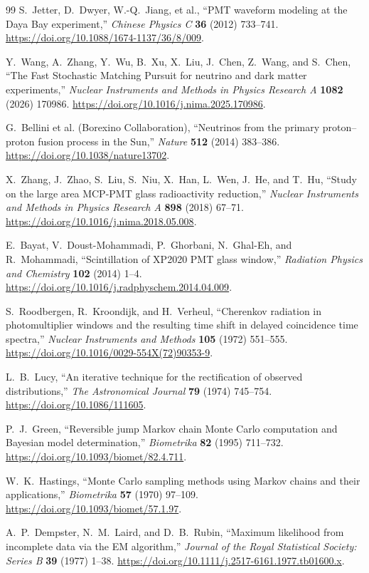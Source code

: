\documentclass[UTF8,a4paper,11pt]{ctexart}
\begin{document}
\begin{thebibliography}{99}
S.~Jetter, D.~Dwyer, W.-Q.~Jiang, et al.,
``PMT waveform modeling at the Daya Bay experiment,''
\emph{Chinese Physics C} \textbf{36} (2012) 733--741.
\url{https://doi.org/10.1088/1674-1137/36/8/009}.

Y.~Wang, A.~Zhang, Y.~Wu, B.~Xu, X.~Liu, J.~Chen, Z.~Wang, and S.~Chen,
``The Fast Stochastic Matching Pursuit for neutrino and dark matter
experiments,''
\emph{Nuclear Instruments and Methods in Physics Research A} \textbf{1082}
(2026) 170986.
\url{https://doi.org/10.1016/j.nima.2025.170986}.

G.~Bellini et al. (Borexino Collaboration),
``Neutrinos from the primary proton--proton fusion process in the Sun,''
\emph{Nature} \textbf{512} (2014) 383--386.
\url{https://doi.org/10.1038/nature13702}.

X.~Zhang, J.~Zhao, S.~Liu, S.~Niu, X.~Han, L.~Wen, J.~He, and T.~Hu,
``Study on the large area MCP-PMT glass radioactivity reduction,''
\emph{Nuclear Instruments and Methods in Physics Research A} \textbf{898}
(2018) 67--71.
\url{https://doi.org/10.1016/j.nima.2018.05.008}.

E.~Bayat, V.~Doust-Mohammadi, P.~Ghorbani, N.~Ghal-Eh, and R.~Mohammadi,
``Scintillation of XP2020 PMT glass window,''
\emph{Radiation Physics and Chemistry} \textbf{102} (2014) 1--4.
\url{https://doi.org/10.1016/j.radphyschem.2014.04.009}.

S.~Roodbergen, R.~Kroondijk, and H.~Verheul,
``Cherenkov radiation in photomultiplier windows and the resulting time shift
in delayed coincidence time spectra,''
\emph{Nuclear Instruments and Methods} \textbf{105} (1972) 551--555.
\url{https://doi.org/10.1016/0029-554X(72)90353-9}.

L.~B.~Lucy,
``An iterative technique for the rectification of observed distributions,''
\emph{The Astronomical Journal} \textbf{79} (1974) 745--754.
\url{https://doi.org/10.1086/111605}.

P.~J.~Green,
``Reversible jump Markov chain Monte Carlo computation and Bayesian model
determination,''
\emph{Biometrika} \textbf{82} (1995) 711--732.
\url{https://doi.org/10.1093/biomet/82.4.711}.

W.~K.~Hastings,
``Monte Carlo sampling methods using Markov chains and their applications,''
\emph{Biometrika} \textbf{57} (1970) 97--109.
\url{https://doi.org/10.1093/biomet/57.1.97}.

A.~P.~Dempster, N.~M.~Laird, and D.~B.~Rubin,
``Maximum likelihood from incomplete data via the EM algorithm,''
\emph{Journal of the Royal Statistical Society: Series B} \textbf{39}
(1977) 1--38.
\url{https://doi.org/10.1111/j.2517-6161.1977.tb01600.x}.

\end{thebibliography}
\endgroup
\end{document}
